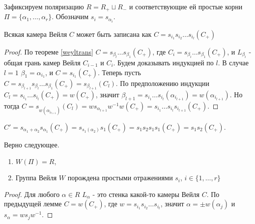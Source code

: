 \documentclass[a4article]{article}
\begin{document}
Зафиксируем поляризацию $R=R_{+} \sqcup R_{-}$ и соответствующие ей простые корни $\Pi = \{\alpha_1, \ldots, \alpha_r\}$. Обозначим $s_i = s_{\alpha_i}$.

\begin{lemma}
    Всякая камера Вейля $C$ может быть записана как $C=s_{i_1}s_{i_2}\ldots s_{i_l}(C_{+})$
\end{lemma}
\begin{proof}
    По теореме \ref{weyltrans} $C=s_{\beta_l}\ldots s_{\beta_1}(C_{+})$, где $C_i = s_{\beta_i}\ldots s_{\beta_1}(C_{+})$, и $L_{\beta_i}$ - общая грань камер Вейля $C_{i-1}$ и $C_{i}$. Будем доказывать индукцией по $l$. В случае $l=1$ $\beta_1 = \alpha_{i_1}$, и $C = s_{i_1}(C_{+})$. Теперь пусть $C=s_{\beta_{l+1}}s_{\beta_l}\ldots s_{\beta_1}(C_{+})=s_{\beta_{l+1}}(C_l)$. По предположению индукции $C_{l}=s_{i_1}\ldots s_{i_l}(C_{+})=w(C_{+})$, значит $\beta_{l+1} = s_{i_1}\ldots s_{i_l}(\alpha_{i_{l+1}})=w(\alpha_{i_{l+1}})$. Но тогда $C=s_{w(\alpha_{i_{l+1}})}(C_l)=ws_{\alpha_{l+1}}w^{-1}w(C_{+})=s_{i_1}\ldots s_{i_l}s_{i_{l+1}}(C_{+})$.
\end{proof}
\begin{example}
    $C' = s_{\alpha_1 + \alpha_2}s_{\alpha_1}(C_{+})=s_{s_{1}(\alpha_2)}s_{1}(C_{+})=s_1s_2s_1s_1(C_+)=s_1s_2(C_+)$.
\end{example}
\begin{theorem}
Верно следующее.
    \begin{enumerate}
        \item $W(\Pi) = R$,
        \item Группа Вейля $W$ порождена простыми отражениями $s_i$, $i \in \{1, \ldots, r\}$
    \end{enumerate}
\end{theorem}
\begin{proof}
    Для любого $\alpha \in R$ $L_{\alpha}$ - это стенка какой-то камеры Вейля $C$. По предыдущей лемме $C=w(C_{+})$, где $w=s_{i_1}s_{i_2}\ldots s_{i_l}$, значит $\alpha = \pm w(\alpha_{j})$ и $s_{\alpha} = ws_jw^{-1}$.
\end{proof}
\end{document}
